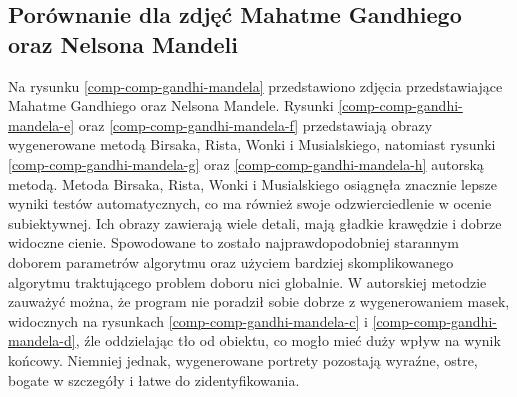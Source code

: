         \subsection{Porównanie dla zdjęć Mahatme Gandhiego oraz Nelsona Mandeli}
    	Na rysunku \ref{comp-comp-gandhi-mandela} przedstawiono zdjęcia przedstawiające Mahatme Gandhiego oraz Nelsona Mandele. Rysunki \ref{comp-comp-gandhi-mandela-e} oraz \ref{comp-comp-gandhi-mandela-f} przedstawiają obrazy wygenerowane metodą Birsaka, Rista, Wonki i Musialskiego, natomiast rysunki \ref{comp-comp-gandhi-mandela-g} oraz \ref{comp-comp-gandhi-mandela-h} autorską metodą. Metoda Birsaka, Rista, Wonki i Musialskiego osiągnęła znacznie lepsze wyniki testów automatycznych, co ma również swoje odzwierciedlenie w ocenie subiektywnej. Ich obrazy zawierają wiele detali, mają gładkie krawędzie i dobrze widoczne cienie. Spowodowane to zostało najprawdopodobniej starannym doborem parametrów algorytmu oraz użyciem bardziej skomplikowanego algorytmu traktującego problem doboru nici globalnie. W autorskiej metodzie zauważyć można, że program nie poradził sobie dobrze z wygenerowaniem masek, widocznych na rysunkach  \ref{comp-comp-gandhi-mandela-c} i \ref{comp-comp-gandhi-mandela-d}, źle oddzielając tło od obiektu, co mogło mieć duży wpływ na wynik końcowy. Niemniej jednak, wygenerowane portrety pozostają wyraźne, ostre, bogate w szczegóły i łatwe do zidentyfikowania.
    	\newpage
    	
